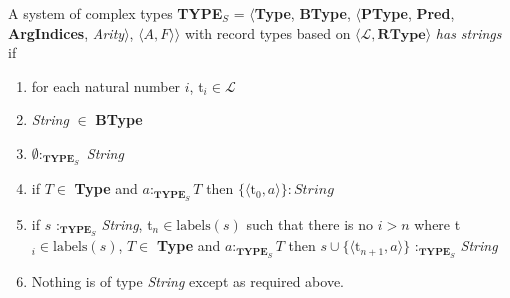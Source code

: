 


A system of complex types  \textbf{TYPE}$_S$ = $\langle${\bf Type}, {\bf BType},
$\langle$\textbf{PType}, {\bf Pred}, \textbf{ArgIndices}, {\it
  Arity\/}$\rangle$, $\langle A,F\rangle$$\rangle$ with record types
based on $\langle\mathcal{L}, \mathbf{RType}\rangle$ \textit{has strings}
if
\begin{enumerate} 
 
\item for each natural number $i$, t$_i\in\mathcal{L}$
 
\item \textit{String} $\in$ \textbf{BType}

\item $\emptyset:_{\mathbf{TYPE}_S}$ \textit{String}

\item if $T \in$ \textbf{Type} and $a:_{\mathbf{TYPE}_S}T$ then
  $\{\langle\text{t}_0,a\rangle\} : \textit{String}$

\item if $s$ :$_{\mathbf{TYPE}_S}$ \textit{String}, t$_n\in\mathrm{labels}(s)$ such that
  there is no $i>n$ where t$_i\in\mathrm{labels}(s)$, $T \in$ \textbf{Type}
  and $a:_{\mathbf{TYPE}_S}T$ then $s\cup\{\langle \mathrm{t}_{n+1},a\rangle\}$ :$_{\mathbf{TYPE}_S}$
  \textit{String}

\item Nothing is of type \textit{String} except as required above.
 
\end{enumerate}

